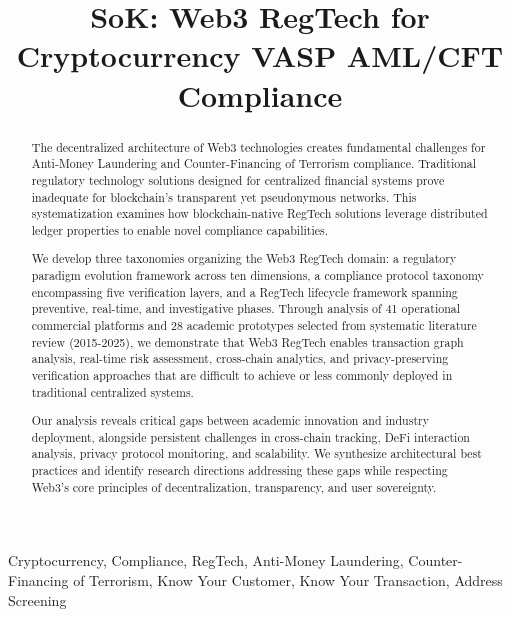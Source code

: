 \documentclass[conference,compsoc]{IEEEtran}
\begin{document}
\title{SoK: Web3 RegTech for Cryptocurrency VASP AML/CFT Compliance}

\author{
}

\newcommand{\fullcirc}{$\bullet$}
\newcommand{\halfcirc}{$\circ$}
\newcommand{\emptycirc}{---}

\maketitle

\begin{abstract}
The decentralized architecture of Web3 technologies creates fundamental challenges for Anti-Money Laundering and Counter-Financing of Terrorism compliance. Traditional regulatory technology solutions designed for centralized financial systems prove inadequate for blockchain's transparent yet pseudonymous networks. This systematization examines how blockchain-native RegTech solutions leverage distributed ledger properties to enable novel compliance capabilities.

We develop three taxonomies organizing the Web3 RegTech domain: a regulatory paradigm evolution framework across ten dimensions, a compliance protocol taxonomy encompassing five verification layers, and a RegTech lifecycle framework spanning preventive, real-time, and investigative phases. Through analysis of 41 operational commercial platforms and 28 academic prototypes selected from systematic literature review (2015-2025), we demonstrate that Web3 RegTech enables transaction graph analysis, real-time risk assessment, cross-chain analytics, and privacy-preserving verification approaches that are difficult to achieve or less commonly deployed in traditional centralized systems.

Our analysis reveals critical gaps between academic innovation and industry deployment, alongside persistent challenges in cross-chain tracking, DeFi interaction analysis, privacy protocol monitoring, and scalability. We synthesize architectural best practices and identify research directions addressing these gaps while respecting Web3's core principles of decentralization, transparency, and user sovereignty.
\end{abstract}

\begin{IEEEkeywords}
Cryptocurrency, Compliance, RegTech, Anti-Money Laundering, Counter-Financing of Terrorism, Know Your Customer, Know Your Transaction, Address Screening
\end{IEEEkeywords}

\IEEEpeerreviewmaketitle












\end{document}
